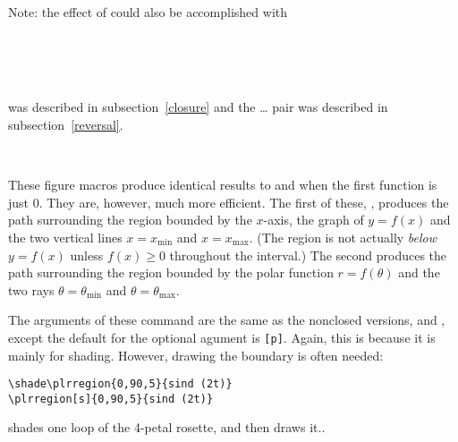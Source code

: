 \documentclass[letterpaper]{article}
\begin{document}
Note: the effect of  could also be accomplished with
\begin{ex}
  \\
    \\
    \\
\end{ex}
 was described in subsection~\ref{closure} and the
\dots{} pair was described in
subsection~\ref{reversal}.

\begin{cd}
%
    \\
%
%
\end{cd}

These figure macros produce identical results to  and
 when the first function is just $0$. They are, however,
much more efficient.  The first of these, , produces the
path surrounding the region bounded by the $x$-axis, the graph of
$y=f(x)$ and the two vertical lines $x=x_{\mathrm{min}}$ and $x =
x_{\mathrm{max}}$. (The region is not actually \emph{below} $y = f(x)$
unless $f(x) \ge 0$ throughout the interval.) The second produces the
path surrounding the region bounded by the polar function $r =
f(\theta)$ and the two rays $\theta=\theta_{\mathrm{min}}$ and
$\theta=\theta_{\mathrm{max}}$.

The arguments of these command are the same as the nonclosed versions,
 and , except the default for the optional
agument is \texttt{[p]}. Again, this is because it is mainly for
shading. However, drawing the boundary is often needed:
\begin{verbatim}
\shade\plrregion{0,90,5}{sind (2t)}
\plrregion[s]{0,90,5}{sind (2t)}
\end{verbatim}
shades one loop of the 4-petal rosette, and then draws it..

\begin{cd}
\end{cd}
\end{document}
